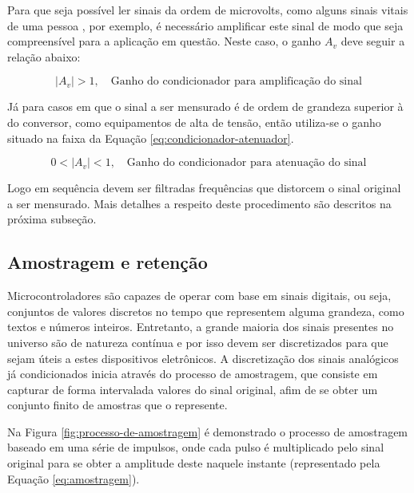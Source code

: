 \documentclass[oneside,openright,12pt]{ufsm_2015} %
\begin{document}
Para que seja possível ler sinais da ordem de microvolts, como alguns sinais vitais de uma pessoa \cite{zhang2014signal}, por exemplo, é necessário amplificar este sinal de modo que seja compreensível para a aplicação em questão. Neste caso, o ganho $A_{v}$ deve seguir a relação abaixo: 

\begin{equation}\label{eq:condicionador-amplificador}
    |A_{v}| > 1,\quad \text{Ganho do condicionador para amplificação do sinal}    
\end{equation}

Já para casos em que o sinal a ser mensurado é de ordem de grandeza superior à do conversor, como equipamentos de alta de tensão, então utiliza-se o ganho situado na faixa da Equação \ref{eq:condicionador-atenuador}.

\begin{equation}\label{eq:condicionador-atenuador}
    0 < |A_{v}| < 1,\quad \text{Ganho do condicionador para atenuação do sinal}    
\end{equation}

Logo em sequência devem ser filtradas frequências que distorcem o sinal original a ser mensurado. Mais detalhes a respeito deste procedimento são descritos na próxima subseção.

\subsection{Amostragem e retenção}
Microcontroladores são capazes de operar com base em sinais digitais, ou seja, conjuntos de valores discretos no tempo que representem alguma grandeza, como textos e números inteiros. Entretanto, a grande maioria dos sinais presentes no universo são de natureza contínua e por isso devem ser discretizados para que sejam úteis a estes dispositivos eletrônicos. A discretização dos sinais analógicos já condicionados inicia através do processo de amostragem, que consiste em capturar de forma intervalada valores do sinal original, afim de se obter um conjunto finito de amostras que o represente.

Na Figura \ref{fig:processo-de-amostragem} é demonstrado o processo de amostragem baseado em uma série de impulsos, onde cada pulso é multiplicado pelo sinal original para se obter a amplitude deste naquele instante (representado pela Equação \ref{eq:amostragem}). 
\end{document}

